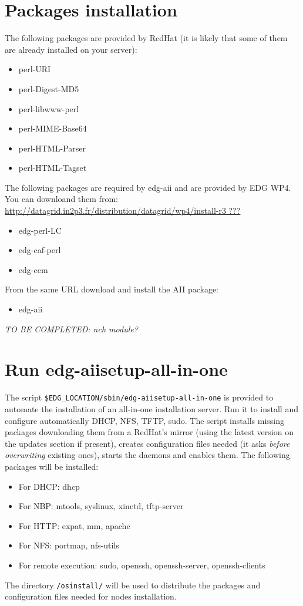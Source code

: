 \documentclass{datagridreport}
\begin{document}
\section{Packages installation} \label{packages}
The following packages are provided by RedHat (it is likely that some of them are already
installed on your server):
\begin{itemize}
\item perl-URI
\item perl-Digest-MD5
\item perl-libwww-perl
\item perl-MIME-Base64
\item perl-HTML-Parser
\item perl-HTML-Tagset
\end{itemize}
The following packages are required by edg-aii and are provided by EDG WP4.
You can downloand them from:\\
\url{http://datagrid.in2p3.fr/distribution/datagrid/wp4/install-r3 ???}
\begin{itemize}
\item edg-perl-LC
\item edg-caf-perl
\item edg-ccm
\end{itemize}
From the same URL download and install the AII package:
\begin{itemize}
\item edg-aii
\end{itemize}

\emph{TO BE COMPLETED: nch module?}

\section{Run edg-aiisetup-all-in-one}
The script \texttt{\$EDG\_LOCATION/sbin/edg-aiisetup-all-in-one} is provided to automate the
installation of an all-in-one installation server. Run it to install and configure automatically
DHCP, NFS, TFTP, sudo. The script installs missing packages downloading them from a RedHat's mirror
(using the latest version on the updates section if present), creates configuration files needed
(it asks \emph{before overwriting} existing ones), starts the daemons and enables them.
The following packages will be installed:
\begin{itemize}
\item For DHCP: dhcp
\item For NBP: mtools, syslinux, xinetd, tftp-server
\item For HTTP: expat, mm, apache
\item For NFS: portmap, nfs-utils
\item For remote execution: sudo, openssh, openssh-server, openssh-clients
\end{itemize}
The directory \texttt{/osinstall/} will be used to distribute the packages and configuration
files needed for nodes installation.
\end{document}
